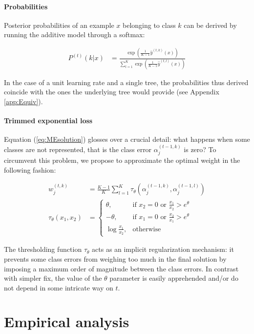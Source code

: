 \documentclass{article}
\begin{document}
\paragraph{Probabilities}
Posterior probabilities of an example $x$ belonging to class $k$ can be derived 
by running the additive model through a softmax:

\begin{align}\label{eq:MEproba}
P^{(t)}(k|x) &= \frac{\exp \left(\frac{1}{K-1} \hat{y}^{(t, k)}(x) 
\right)}{\sum_{l=1}^K\exp \left(\frac{1}{K-1} \hat{y}^{(t, l)}(x) \right)}
\end{align}

In the case of a unit learning rate and a single tree, the probabilities thus 
derived coincide with the ones the underlying tree would provide (see Appendix 
\ref{app:Equiv}).


\paragraph{Trimmed exponential loss}
Equation (\ref{eq:MEsolution}) glosses over a crucial detail: what happens when 
some classes are not represented, that is the class error $\alpha_j^{(t-1, k)}$ 
is zero? To circumvent this problem, we propose to approximate the optimal 
weight in the following fashion:

\begin{align}\label{eq:METrimmed}
w_j^{(t,k)} &= \frac{K-1}{K} \sum_{l=1}^{K} \tau_{\theta} \left(\alpha_j^{(t-1, 
k)},  \alpha_j^{(t-1, l)}\right)\\
\tau_{\theta}(x_1, x_2) &=\begin{cases}
    \theta, & \text{if $x_2 = 0$ or $\frac{x_1}{x_2} > e^{\theta}$}\\
    -\theta,& \text{if $x_1 = 0$ or $\frac{x_2}{x_1} > e^{\theta}$}\\
    \log \frac{x_1}{x_2}, & \text{otherwise}
  \end{cases}
\end{align}

The thresholding function $\tau_{\theta}$ acts as an implicit regularization 
mechanism: it prevents some class errors from weighing too much in the final 
solution by imposing a maximum order of magnitude between the class errors. In 
contrast with simpler fix, the value of the  $\theta$ parameter is easily 
apprehended and/or do not depend in some intricate way on $t$.




\section{Empirical analysis}
\label{sec:analysis}
\end{document}
